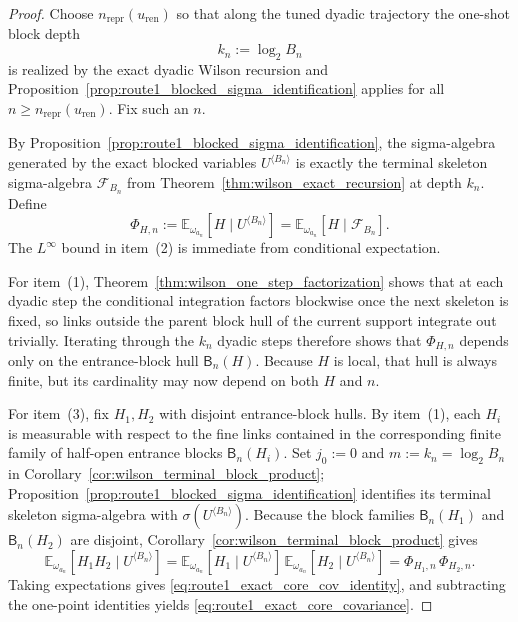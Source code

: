 \begin{proof}
Choose $n_{\mathrm{repr}}(u_{\mathrm{ren}})$ so that along the tuned dyadic trajectory the one-shot block depth
\[
k_n:=\log_2 B_n
\]
is realized by the exact dyadic Wilson recursion and Proposition~\ref{prop:route1_blocked_sigma_identification} applies for all $n\ge n_{\mathrm{repr}}(u_{\mathrm{ren}})$.
Fix such an $n$.

By Proposition~\ref{prop:route1_blocked_sigma_identification}, the sigma-algebra generated by the exact blocked variables $U^{\langle B_n\rangle}$ is exactly the terminal skeleton sigma-algebra $\mathcal F_{B_n}$ from Theorem~\ref{thm:wilson_exact_recursion} at depth $k_n$.
Define
\[
\Phi_{H,n}:=\mathbb E_{\omega_{a_n}}[H\mid U^{\langle B_n\rangle}]
=\mathbb E_{\omega_{a_n}}[H\mid \mathcal F_{B_n}].
\]
The $L^\infty$ bound in item~(2) is immediate from conditional expectation.

For item~(1), Theorem~\ref{thm:wilson_one_step_factorization} shows that at each dyadic step the conditional integration factors blockwise once the next skeleton is fixed, so links outside the parent block hull of the current support integrate out trivially.
Iterating through the $k_n$ dyadic steps therefore shows that $\Phi_{H,n}$ depends only on the entrance-block hull $\mathsf B_n(H)$.
Because $H$ is local, that hull is always finite, but its cardinality may now depend on both $H$ and $n$.

For item~(3), fix $H_1,H_2$ with disjoint entrance-block hulls.
By item~(1), each $H_i$ is measurable with respect to the fine links contained in the corresponding finite family of half-open entrance blocks $\mathsf B_n(H_i)$.
Set $j_0:=0$ and $m:=k_n=\log_2 B_n$ in Corollary~\ref{cor:wilson_terminal_block_product}; Proposition~\ref{prop:route1_blocked_sigma_identification} identifies its terminal skeleton sigma-algebra with $\sigma(U^{\langle B_n\rangle})$.
Because the block families $\mathsf B_n(H_1)$ and $\mathsf B_n(H_2)$ are disjoint, Corollary~\ref{cor:wilson_terminal_block_product} gives
\[
\mathbb E_{\omega_{a_n}}[H_1H_2\mid U^{\langle B_n\rangle}]
=
\mathbb E_{\omega_{a_n}}[H_1\mid U^{\langle B_n\rangle}]\,
\mathbb E_{\omega_{a_n}}[H_2\mid U^{\langle B_n\rangle}]
=
\Phi_{H_1,n}\,\Phi_{H_2,n}.
\]
Taking expectations gives \eqref{eq:route1_exact_core_cov_identity}, and subtracting the one-point identities yields \eqref{eq:route1_exact_core_covariance}.
\end{proof}



